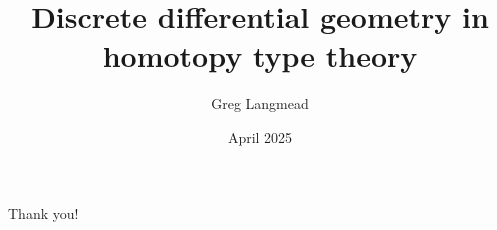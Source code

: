 \documentclass[13pt,aspectratio=169,hyperref={hypertexnames = false}]{beamer}
\title[Geometry in HoTT]{Discrete differential geometry in homotopy type theory}
\author{Greg Langmead}
\institute[CMU]{Carnegie Mellon University}
\date{April 2025}
\begin{document}
\begin{frame}
\titlepage
\end{frame}

\newlength{\mylen}
\newlength{\mylin}









\begin{frame}
\begin{center}
\alert{\huge{Thank you!}}
\end{center}
\end{frame}
\end{document}
